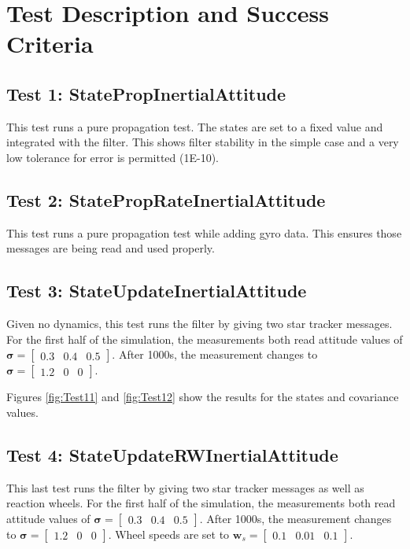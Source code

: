 
\newpage

\section{Test Description and Success Criteria}

\subsection{Test 1: StatePropInertialAttitude}

This test runs a pure propagation test. The states are set to a fixed value and integrated with the filter.
This shows filter stability in the simple case and a very low tolerance for error is permitted (1E-10). 

\subsection{Test 2: StatePropRateInertialAttitude}

This test runs a pure propagation test while adding gyro data. This ensures those messages are being read and used properly. 

\subsection{Test 3: StateUpdateInertialAttitude}

Given no dynamics, this test runs the filter by giving two star tracker messages. For the first half of the simulation, the measurements both read attitude values of $\bm \sigma =  \begin{bmatrix} 0.3 & 0.4 & 0.5 \end{bmatrix}$. After 1000s, the measurement changes to $\bm \sigma = \begin{bmatrix} 1.2 & 0 & 0 \end{bmatrix}$.

Figures \ref{fig:Test11} and \ref{fig:Test12} show the results for the states and covariance values. 
 
 
 
\subsection{Test 4: StateUpdateRWInertialAttitude}

This last test runs the filter by giving two star tracker messages as well as reaction wheels. For the first half of the simulation, the measurements both read attitude values of $\bm \sigma = \begin{bmatrix} 0.3 & 0.4 & 0.5 \end{bmatrix}$. After 1000s, the measurement changes to $\bm \sigma = \begin{bmatrix} 1.2 & 0 & 0 \end{bmatrix}$. Wheel speeds are set to $\bm w_s = \begin{bmatrix} 0.1& 0.01& 0.1\end{bmatrix}$.


